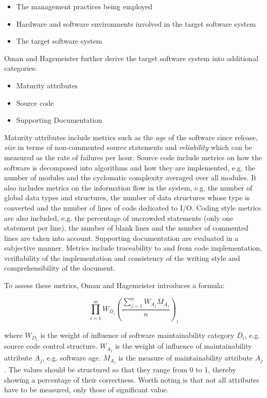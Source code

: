 \begin{itemize}
\item The management practices being employed
\item Hardware and software environments involved in the target software system
\item The target software system
\end{itemize}

Oman and Hagemeister further derive the target software system into additional
categories:

\begin{itemize}
\item Maturity attributes
\item Source code
\item Supporting Documentation
\end{itemize}

Maturity attributes include metrics such as the \textit{age} of the software
since release, \textit{size} in terms of non-commented source statements and
\textit{reliability} which can be measured as the rate of failures per hour.
Source code include metrics on how the software is decomposed into algorithms
and how they are implemented, e.g. the number of modules and the cyclomatic
complexity averaged over all modules. It also includes metrics on the
information flow in the system, e.g. the number of global data types and
structures, the number of data structures whose type is converted and the
number of lines of code dedicated to I/O. Coding style metrics are also
included, e.g. the percentage of uncrowded statements (only one statement per
line), the number of blank lines and the number of commented lines are taken
into account. Supporting documentation are evaluated in a subjective manner.
Metrics include traceability to and from code implementation, verifiability of
the implementation and consistency of the writing style and comprehensibility
of the document. \cite{oman1992metrics}

To assess these metrics, Oman and Hagemeister introduces a formula:

$$
\prod_{i=1}^m{W_D_i(\frac{\sum_{j=1}^n{W_A_jM_A_j}}{n})_i}
$$

where $W_D_i$ is the weight of influence of software maintainability category
$D_i$, e.g.  source code control structure. $W_A_j$ is the weight of influence
of maintainability attribute $A_j$, e.g. software age. $M_A_j$ is the measure
of maintainability attribute $A_j$. The values should be structured so that
they range from 0 to 1, thereby showing a percentage of their correctness.
Worth noting is that not all attributes have to be measured, only those of
significant value.


